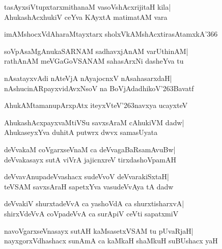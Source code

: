 \documentclass[twoside,12pt,openright]{book}
\def\S{\char'263}
\newcounter{shloka}[chapter]
\begin{document}
\begin{shloka}%
tasAyxsiVtupxtarxmithanaM vasoVshAcxrijitaH kila|\\
AhukashAcxhukiV ceYva KAyxtA matimatAM vara
\end{shloka}

\begin{shloka}%
imAMshocxVdAharaMtayxtarx sholxVkAMshAcxtirasAtamxkA\char'366
\end{shloka}

\begin{shloka}%
soVpAsaMgAnukaSARNAM sadhavxjAnAM varUthinAM|\\
rathAnAM meVGaGoVSANAM sahasArxNi dasheYva tu
\end{shloka}

\begin{shloka}%
nAsatayxvAdi nAteVjA nAyajocnxV nAsahasarxdaH|\\
nAshucinARpayxvidAvxNsoV na BoVjAdadhikoV\S Bavatf
\end{shloka}

\begin{shloka}%
AhukAMtamanupArxpAtx iteyxVteV\S navxya ucayxteV
\end{shloka}

\begin{shloka}%
AhukashAcxpayxvaMtiVSu savxsAraM cAhukiVM dadw|\\
AhukaseyxYva duhitA putwrx dwvx samasUyata
\end{shloka}

\begin{shloka}%
deVvakaM coVgarxseVnaM ca deVvagaBaRsamAvuBw|\\
deVvakasayx sutA viVrA jajicnxreV tirxdashoVpamAH
\end{shloka}

\begin{shloka}%
deVvavAnupadeVvashacx sudeVvoV deVvarakiSxtaH|\\
teVSAM savxsAraH sapetxYva vasudeVvAya tA dadw
\end{shloka}

\begin{shloka}%
deVvakiV shurxtadeVvA ca yashoVdA ca shurxtisharxvA|\\
shirxVdeVvA coVpadeVvA ca surApiV ceVti sapatxmiV
\end{shloka}

\begin{shloka}%
navoVgarxseVnasayx sutAH kaMsasetxVSAM tu pUvaRjaH|\\
nayxgorxVdhashacx sunAmA ca kaMkaH shaMkuH suBUshacx yaH
\end{shloka}
\end{document}
